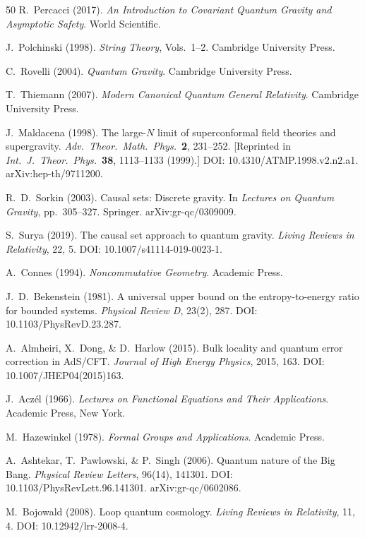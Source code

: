 \documentclass[aps,prd,twocolumn,superscriptaddress,nofootinbib]{revtex4-2}
\begin{document}
\begin{thebibliography}{50}
R.~Percacci (2017).
\textit{An Introduction to Covariant Quantum Gravity and Asymptotic Safety}.
World Scientific.

J.~Polchinski (1998).
\textit{String Theory}, Vols.~1--2.
Cambridge University Press.

C.~Rovelli (2004).
\textit{Quantum Gravity}.
Cambridge University Press.

T.~Thiemann (2007).
\textit{Modern Canonical Quantum General Relativity}.
Cambridge University Press.

J.~Maldacena (1998).
The large-$N$ limit of superconformal field theories and supergravity.
\textit{Adv.\ Theor.\ Math.\ Phys.}\ \textbf{2}, 231--252.
[Reprinted in \textit{Int.\ J.\ Theor.\ Phys.}\ \textbf{38}, 1113--1133 (1999).]
DOI: 10.4310/ATMP.1998.v2.n2.a1.
arXiv:hep-th/9711200.

R.~D.~Sorkin (2003).
Causal sets: Discrete gravity.
In \textit{Lectures on Quantum Gravity}, pp.\ 305--327.
Springer.
arXiv:gr-qc/0309009.

S.~Surya (2019).
The causal set approach to quantum gravity.
\textit{Living Reviews in Relativity}, 22, 5.
DOI: 10.1007/s41114-019-0023-1.

A.~Connes (1994).
\textit{Noncommutative Geometry}.
Academic Press.

J.~D.~Bekenstein (1981).
A universal upper bound on the entropy-to-energy ratio for bounded systems.
\textit{Physical Review D}, 23(2), 287.
DOI: 10.1103/PhysRevD.23.287.

A.~Almheiri, X.~Dong, \& D.~Harlow (2015).
Bulk locality and quantum error correction in AdS/CFT.
\textit{Journal of High Energy Physics}, 2015, 163.
DOI: 10.1007/JHEP04(2015)163.

J.~Acz\'el (1966).
\textit{Lectures on Functional Equations and Their Applications}.
Academic Press, New York.

M.~Hazewinkel (1978).
\textit{Formal Groups and Applications}.
Academic Press.

A.~Ashtekar, T.~Pawlowski, \& P.~Singh (2006).
Quantum nature of the Big Bang.
\textit{Physical Review Letters}, 96(14), 141301.
DOI: 10.1103/PhysRevLett.96.141301.
arXiv:gr-qc/0602086.

M.~Bojowald (2008).
Loop quantum cosmology.
\textit{Living Reviews in Relativity}, 11, 4.
DOI: 10.12942/lrr-2008-4.


\end{thebibliography}
\end{document}
